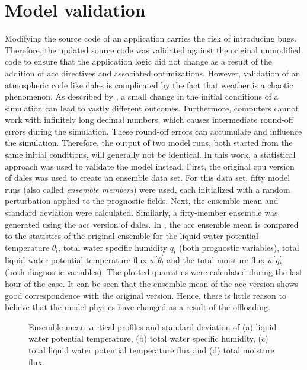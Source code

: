 \section{Model validation}
Modifying the source code of an application carries the risk of introducing bugs. Therefore, the updated source code was validated against the original unmodified code to ensure that the application logic did not change as a result of the addition of \acrshort{acc} directives and associated optimizations. However, validation of an atmospheric code like \acrshort{dales} is complicated by the fact that weather is a chaotic phenomenon. As described by \citet{lorenzDeterministicNonperiodicFlow1963}, a small change in the initial conditions of a simulation can lead to vastly different outcomes. Furthermore, computers cannot work with infinitely long decimal numbers, which causes intermediate round-off errors during the simulation. These round-off errors can accumulate and influence the simulation. Therefore, the output of two model runs, both started from the same initial conditions, will generally not be identical. In this work, a statistical approach was used to validate the model instead. First, the original \acrshort{cpu} version of \acrshort{dales} was used to create an ensemble data set. For this data set, fifty model runs (also called \emph{ensemble members}) were used, each initialized with a random perturbation applied to the prognostic fields. Next, the ensemble mean and standard deviation were calculated. Similarly, a fifty-member ensemble was generated using the \acrshort{acc} version of \acrshort{dales}. In , the \acrshort{acc} ensemble mean is compared to the statistics of the original ensemble for the liquid water potential temperature $\theta_l$, total water specific humidity $q_t$ (both prognostic variables), total liquid water potential temperature flux $w^\prime \theta_l^\prime$ and the total moisture flux $w^\prime q_t^\prime$ (both diagnostic variables). The plotted quantities were calculated during the last hour of the case. It can be seen that the ensemble mean of the \acrshort{acc} version shows good correspondence with the original version. Hence, there is little reason to believe that the model physics have changed as a result of the offloading.

\begin{figure}
    \centering
    
    \caption{Ensemble mean vertical profiles and standard deviation of (a) liquid water potential temperature, (b) total water specific humidity, (c) total liquid water potential temperature flux and (d) total moisture flux.}
    \label{fig:validation}
\end{figure}

